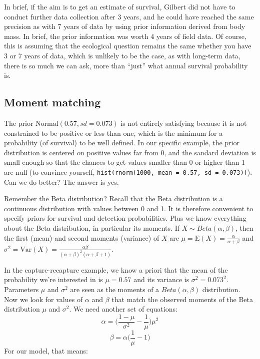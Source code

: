 \documentclass[
  12pt,
]{krantz}
\begin{document}
In brief, if the aim is to get an estimate of survival, Gilbert did not have to conduct further data collection after 3 years, and he could have reached the same precision as with 7 years of data by using prior information derived from body mass. In brief, the prior information was worth 4 years of field data. Of course, this is assuming that the ecological question remains the same whether you have 3 or 7 years of data, which is unlikely to be the case, as with long-term data, there is so much we can ask, more than ``just'' what annual survival probability is.

\hypertarget{moment-matching}{%
\subsection{Moment matching}\label{moment-matching}}

The prior \(\text{Normal}(0.57, sd = 0.073)\) is not entirely satisfying because it is not constrained to be positive or less than one, which is the minimum for a probability (of survival) to be well defined. In our specific example, the prior distribution is centered on positive values far from 0, and the sandard deviation is small enough so that the chances to get values smaller than 0 or higher than 1 are null (to convince yourself, \texttt{hist(rnorm(1000,\ mean\ =\ 0.57,\ sd\ =\ 0.073))}). Can we do better? The answer is yes.

Remember the Beta distribution? Recall that the Beta distribution is a continuous distribution with values between 0 and 1. It is therefore convenient to specify priors for survival and detection probabilities. Plus we know everything about the Beta distribution, in particular its moments. If \(X \sim Beta(\alpha,\beta)\), then the first (mean) and second moments (variance) of \(X\) are \(\mu = \text{E}(X) = \frac{\alpha}{\alpha + \beta}\) and \(\sigma^2 = \text{Var}(X) = \frac{\alpha\beta}{(\alpha + \beta)^2 (\alpha + \beta + 1)}\).

In the capture-recapture example, we know a priori that the mean of the probability we're interested in is \(\mu = 0.57\) and its variance is \(\sigma^2 = 0.073^2\). Parameters \(\mu\) and \(\sigma^2\) are seen as the moments of a \(Beta(\alpha,\beta)\) distribution. Now we look for values of \(\alpha\) and \(\beta\) that match the observed moments of the Beta distribution \(\mu\) and \(\sigma^2\). We need another set of equations:
\[\alpha = \bigg(\frac{1-\mu}{\sigma^2}- \frac{1}{\mu} \bigg)\mu^2\]
\[\beta = \alpha \bigg(\frac{1}{\mu}-1\bigg)\]
For our model, that means:
\end{document}
